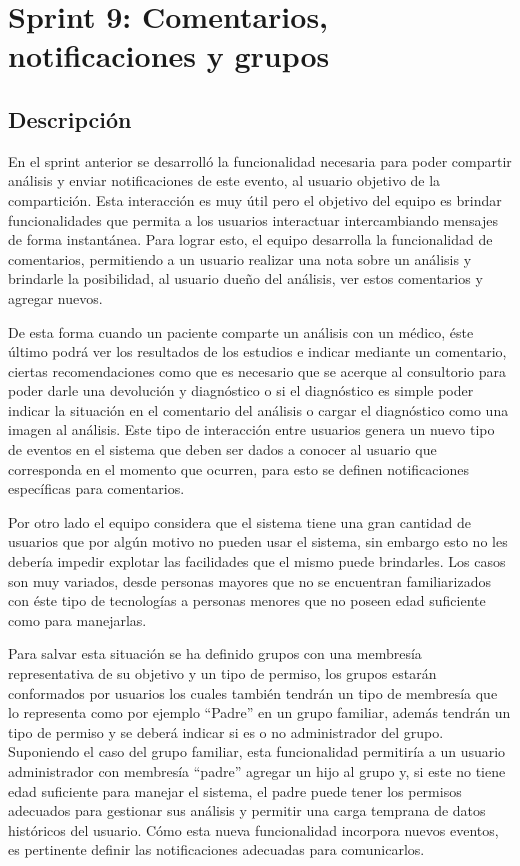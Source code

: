 \section{Sprint 9: Comentarios, notificaciones y grupos}



\subsection{Descripción}

En el sprint anterior se desarrolló la funcionalidad necesaria para poder compartir análisis y enviar notificaciones de este evento, al usuario objetivo de la compartición. Esta interacción es muy útil pero el objetivo del equipo es brindar funcionalidades que permita a los usuarios interactuar intercambiando mensajes de forma instantánea. Para lograr esto, el equipo desarrolla la funcionalidad de comentarios, permitiendo a un usuario realizar una nota sobre un análisis y brindarle la posibilidad, al usuario dueño del análisis, ver estos comentarios y agregar nuevos. 

De esta forma cuando un paciente comparte un análisis con un médico, éste último podrá ver los resultados de los estudios e indicar mediante un comentario, ciertas recomendaciones como que es necesario que se acerque al consultorio para poder darle una devolución y diagnóstico o si el diagnóstico es simple poder indicar la situación en el comentario del análisis o cargar el diagnóstico como una imagen al análisis. Este tipo de interacción entre usuarios genera un nuevo tipo de eventos en el sistema que deben ser dados a conocer al usuario que corresponda en el momento que ocurren, para esto se definen notificaciones específicas para comentarios.

Por otro lado el equipo considera que el sistema tiene una gran cantidad de usuarios que por algún motivo no pueden usar el sistema, sin embargo esto no les debería impedir explotar las facilidades que el mismo puede brindarles. Los casos son muy variados, desde personas mayores que no se encuentran familiarizados con éste tipo de tecnologías a personas menores que no poseen edad suficiente como para manejarlas. 

Para salvar esta situación se ha definido grupos con una membresía representativa de su objetivo y un tipo de permiso, los grupos estarán conformados por usuarios los cuales también tendrán un tipo de membresía que lo representa como por ejemplo ``Padre'' en un grupo familiar, además tendrán un tipo de permiso y se deberá indicar si es o no administrador del grupo. Suponiendo el caso del grupo familiar, esta funcionalidad permitiría a un usuario administrador con membresía ``padre'' agregar un hijo al grupo y, si este no tiene edad suficiente para manejar el sistema, el padre puede tener los permisos adecuados para gestionar sus análisis y permitir una carga temprana de datos históricos del usuario. Cómo esta nueva funcionalidad incorpora nuevos eventos, es pertinente definir las notificaciones adecuadas para comunicarlos.

